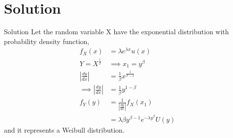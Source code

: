 \documentclass{beamer}
\begin{document}
\section{Solution}
\begin{frame}{Solution}
Let the random variable X have the exponential distribution with probability density
function,
\begin{align}
   f_X(x)&=\lambda e^{\lambda x} u(x)\\
   Y=X^{\frac{1}{\beta}} &\implies x_1=y^{\beta}\\
   |\frac{dy}{dx}|&=\frac{1}{\beta} x^\frac{1}{\beta -1}\\
   \implies|\frac{dy}{dx}|&=\frac{1}{\beta} y^{1-\beta}\\
   f_Y(y)&=\frac{1}{|\frac{dy}{dx}|}f_X(x_1)\\
         &=\lambda \beta y^{\beta -1} e^{-\lambda y^{\beta}} U(y)
\end{align}
and it represents a Weibull distribution.
\end{frame}
\end{document}
